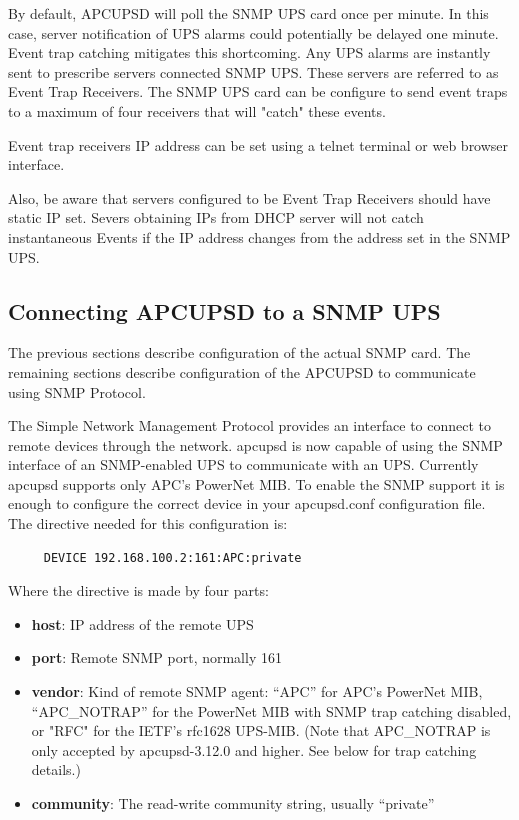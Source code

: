 {{{{{{{By default, APCUPSD will poll the SNMP UPS card once per minute.  In this case,
server notification of UPS alarms could potentially be delayed one minute.  Event trap
catching mitigates this shortcoming.  Any UPS alarms are instantly sent to 
prescribe servers connected SNMP UPS.  These servers are referred to as Event Trap Receivers.
The SNMP UPS card can be configure to send event traps to a maximum of four 
receivers that will "catch" these events.  

Event trap receivers IP address can be set using a telnet terminal or web browser interface.

Also, be aware that servers configured to be Event Trap Receivers should have static IP set.
Severs obtaining IPs from DHCP server will not catch instantaneous Events if the IP address changes from
the address set in the SNMP UPS.

\label{Connecting-APCUPSD-to-a-SNMP-UPS}

\subsection*{Connecting APCUPSD to a SNMP UPS}

\label{index-SNMP_002c-Connecting-163}

The previous sections describe configuration of the actual SNMP card.
The remaining sections describe configuration of the APCUPSD to communicate
using SNMP Protocol.


The Simple Network Management Protocol provides an interface to connect to
remote devices through the network. apcupsd is now capable of using the SNMP
interface of an SNMP-enabled UPS to communicate with an UPS. Currently apcupsd
supports only APC's PowerNet MIB. To enable the SNMP support it is enough to
configure the correct device in your apcupsd.conf configuration file. The
directive needed for this configuration is: 

\footnotesize
\begin{verbatim}
     DEVICE 192.168.100.2:161:APC:private
\end{verbatim}
\normalsize

Where the directive is made by four parts:  

\begin{itemize}
\item {\bf host}: IP address of the remote UPS  
\item {\bf port}: Remote SNMP port, normally 161
\item {\bf vendor}: Kind of remote SNMP agent: ``APC'' for APC's PowerNet MIB, 
``APC\_NOTRAP'' for the PowerNet MIB with SNMP trap catching disabled, or "RFC"
for the IETF's rfc1628 UPS-MIB. (Note that APC\_NOTRAP is only accepted by 
apcupsd-3.12.0 and higher. See below for trap catching details.)
\item {\bf community}: The read-write community string, usually ``private''
\end{itemize}


}}}}}}}
